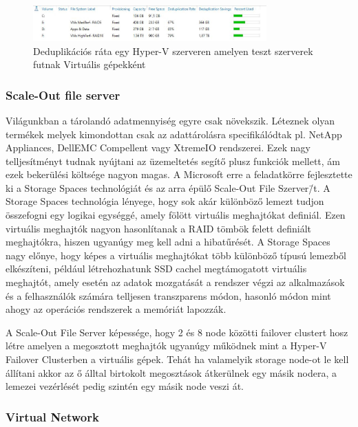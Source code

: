\documentclass[12pt,oneside,justify]{book}
\begin{document}
\begin{figure}[h]
\centering
\includegraphics[width=0.8\textwidth]{deduplication-ratio-sample}
\caption{Deduplikációs ráta egy Hyper-V szerveren amelyen teszt szerverek futnak Virtuális gépekként}
\label{fig:deduplication-ratio}
\end{figure}

\subsubsection{Scale-Out file server}

Világunkban a tárolandó adatmennyiség egyre csak növekszik. Léteznek olyan termékek melyek kimondottan csak az adattárolásra specifikálódtak pl. NetApp Appliances, DellEMC Compellent vagy XtremeIO rendszerei. Ezek nagy telljesítményt tudnak nyújtani az üzemeltetés segítő plusz funkciók mellett, ám ezek bekerülési költsége nagyon magas.
A Microsoft erre a feladatkörre fejlesztette ki a Storage Spaces technológiát és az arra épülő Scale-Out File Szerver\=/t.
\newline
A Storage Spaces technológia lényege, hogy sok akár különböző lemezt tudjon összefogni egy logikai egységgé, amely fölött virtuális meghajtókat definiál. Ezen virtuális meghajtók nagyon hasonlítanak a RAID tömbök felett definiált meghajtókra, hiszen ugyanúgy meg kell adni a hibatűrését.  A Storage Spaces nagy előnye, hogy képes a virtuális meghajtókat több különböző típusú lemezből elkészíteni, például létrehozhatunk SSD cachel megtámogatott virtuális meghajtót, amely esetén az adatok mozgatását a rendszer végzi az alkalmazások és a felhasználók számára telljesen transzparens módon, hasonló módon mint ahogy az operációs rendszerek a memóriát lapozzák.

A Scale-Out File Server képessége, hogy 2 és 8 node közötti failover clustert hosz létre amelyen a megosztott meghajtók ugyanúgy működnek mint a Hyper-V Failover Clusterben a virtuális gépek. Tehát ha valamelyik storage node-ot le kell állítani akkor az ő álltal birtokolt megosztások átkerülnek egy másik nodera, a lemezei vezérlését pedig szintén egy másik node veszi át.

\subsubsection{Virtual Network}
\end{document}
